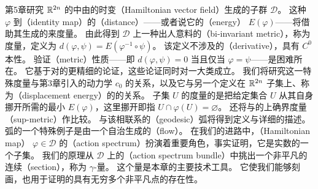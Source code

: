 第5章研究 $\mathbb{R}^{2n}$ 的\trSymplectic\trDiffeomorphism{}中由\trCompactSupport{}的时变\textbf{\trHamiltonianVectorField}（Hamiltonian vector field）生成的子群 $\mathcal{D}$。
这种\trSymplectic\trDiffeomorphism{} $\varphi$ 到\textbf{\trIdentityMap}（identity map）的\textbf{\trDistance}（distance）——或者说它的\textbf{\trEnergy}（energy） $E(\varphi)$——将借助其生成\trHamiltonianFunction{}的\trOscillation{}来度量。
由此得到 $\mathcal{D}$ 上一种出人意料的\textbf{\trBiInvariantMetric}（bi-invariant metric），称为\trHofer{}度量，定义为 $d(\varphi,\psi)=E(\varphi^{-1}\circ\psi)$。
该定义不涉及\trHamiltonianFunction{}的\textbf{\trDerivative}（derivative），具有 $C^0$ 本性。
验证\textbf{\trMetric}（metric）性质——即 $d(\varphi,\psi)=0$ 当且仅当 $\varphi=\psi$——是困难所在。
它基于对\trActionFunctional{}的更精细的\trMinimax{}论证，这些论证同时对一大类\trHamiltonianFunction{}成立。
我们将研究这一特殊度量与第3章引入的动力学\trSymplecticInvariant{} $c_0$ 的关系，以及它与另一个定义在 $\mathbb{R}^{2n}$ 子集上、称为\textbf{\trDisplacementEnergy}（displacement energy）的\trSymplecticInvariant{}的关系。
子集 $U$ 的\trDisplacementEnergy{}度量的是把给定集合 $U$ 从其自身挪开所需的最小\trEnergy{} $E(\varphi)$，这里挪开即指 $U\cap\varphi(U)=\varnothing$。
\trBiInvariantMetric{}还将与\trStandard{}的上确界度量（sup-metric）作比较。
与该\trMetric{}相联系的\textbf{\trGeodesic}（geodesic）弧将得到定义与详细的描述。
\trGeodesic{}弧的一个特殊例子是由一个自治\trHamiltonianFunction{}生成的\textbf{\trFlow}（flow）。
在我们的进路中，\textbf{\trHamiltonianMap}（Hamiltonian map） $\varphi\in\mathcal{D}$ 的\textbf{\trActionSpectrum}（action spectrum）扮演着重要角色，事实证明，它是实数的一个\trNowhereDense{}子集。
我们的\trMinimax{}原理从 $\mathcal{D}$ 上的\textbf{\trActionSpectrum{}\trBundle}（action spectrum bundle）中挑出一个非平凡的连续\textbf{\trSection}（section），称为 $\gamma$-\trInvariant{}量。
这个\trInvariant{}量是本章的主要技术工具。
它使我们能够刻画\trGeodesic，也用于证明\trCompactSupport{}的\trHamiltonianMap{}具有无穷多个非平凡\trPeriodic{}点的存在性。

